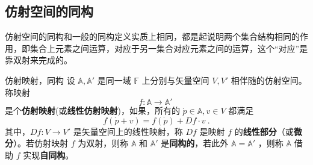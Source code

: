 \subsection{仿射空间的同构}
仿射空间的同构和一般的同构定义实质上相同，都是起说明两个集合结构相同的作用，即集合上元素之间运算，对应于另一集合对应元素之间的运算，这个“对应”是靠双射来完成的。
\begin{definition}{仿射映射，同构}\label{def_AfSp_2}
设 $\mathbb A,\mathbb A'$ 是同一域 $\mathbb F$ 上分别与矢量空间 $V,V'$ 相伴随的仿射空间。称映射 
\begin{equation}
f:\mathbb A\rightarrow\mathbb A'~
\end{equation}
是个\textbf{仿射映射}(或\textbf{线性仿射映射})，如果，所有的 $\dot p\in \mathbb A,v\in V$ 都满足
\begin{equation}
f(\dot p+v)=f(\dot p)+Df\cdot v~.
\end{equation}
 其中，$Df:V\rightarrow V'$ 是矢量空间上的线性映射，称 $Df$ 是映射 $f$ 的\textbf{线性部分}（或\textbf{微分}）。若仿射映射 $f$ 为双射，则称 $\mathbb A$ 和 $\mathbb A'$ 是\textbf{同构的}，若此外 $\mathbb A=\mathbb A'$ ，则称 $\mathbb A$ 借助 $f$ 实现\textbf{自同构}。
\end{definition}

